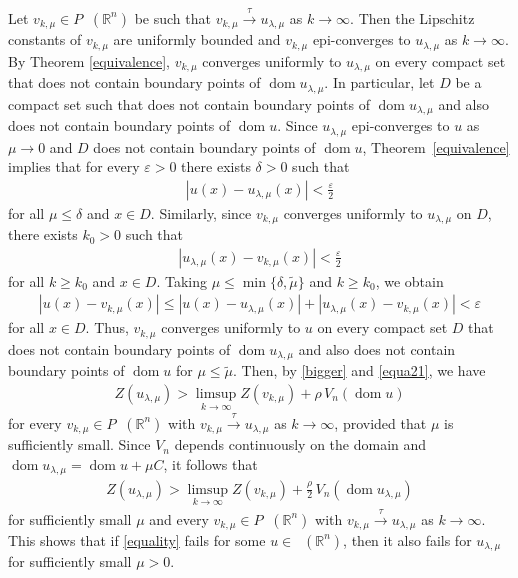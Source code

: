 \documentclass[11pt]{article}
\theoremstyle{definition} %
\newcommand{\RR}{(\mathbb{R}^n)}
\DeclareMathOperator{\LQ}{_{l.q}}
\DeclareMathOperator{\dom}{dom}
\DeclareMathOperator{\LP}{Conv_{lp}}
\newcommand{\seq}{\xrightarrow{\tau}}
\begin{document}
Let $v_{k,\mu}\in P\LQ\RR$ be such that $v_{k,\mu}\seq u_{\lambda,\mu}$ as $k\to \infty$. Then the Lipschitz constants  of $v_{k,\mu}$ are uniformly bounded and  $v_{k,\mu}$ epi-converges to $u_{\lambda,\mu}$ as $k\to \infty$. By Theorem \ref{equivalence}, $v_{k,\mu}$ converges uniformly to $u_{\lambda,\mu}$ on every compact set that does not contain boundary points of $\dom u_{\lambda,\mu}$.  In particular, let $D$ be a compact set  such that does not contain boundary points 
of $\dom u_{\lambda,\mu}$ and also does not contain boundary points of $\dom u$.  Since $u_{\lambda,\mu}$ epi-converges to $u$ as $\mu \to 0$ and $D$ does not 
contain boundary points of $\dom u$, Theorem~\ref{equivalence} implies that 
for every $\varepsilon > 0$ there exists $\delta > 0$ such that
\begin{align*}
    |u(x)-u_{\lambda,\mu}(x)|< \frac{\varepsilon}{2}
\end{align*}
for all $\mu\le \delta$ and $x\in D$. Similarly, since $v_{k,\mu}$ converges uniformly to $u_{\lambda,\mu}$ on $D$,  there exists $k_0 > 0$ such that
\begin{align*}
    |u_{\lambda,\mu}(x)- v_{k,\mu}(x)|< \frac{\varepsilon}{2}
\end{align*}
for all $k\geq k_0$ and $x\in D$. Taking $\mu \le \min\{\delta,\tilde{\mu}\}$ and $k\geq k_0$, we obtain 
\begin{align*}
    |u(x)-v_{k,\mu}(x)|\leq |u(x)-u_{\lambda,\mu}(x)|+ |u_{\lambda,\mu}(x)- v_{k,\mu}(x)|< \varepsilon
\end{align*}
for all $x\in D$. Thus, $v_{k,\mu }$ converges uniformly to $u$ on every compact set  $D$ that does not contain boundary points of $\dom u_{\lambda,\mu} $ and also does not contain boundary points of $\dom u$ for $\mu\leq \tilde{\mu}$. Then, by  \eqref{bigger} and  \eqref{equa21}, we have 
\begin{align*}
 Z\left(u_{\lambda,\mu}\right)>  \limsup_{k\rightarrow \infty} Z(v_{k,\mu})+\rho \, V_n(\dom u)   
\end{align*}
for every $v_{k,\mu}\in P\LQ\RR$ with $v_{k,\mu}\seq u_{\lambda,\mu}$ as $k\to \infty$, provided that $\mu$ is sufficiently small.   Since $V_n$ depends continuously on the domain and $\dom u_{\lambda,\mu}= \dom u +\mu C$, it follows that
\begin{align*}
Z\left(u_{\lambda,\mu}\right)>  \limsup_{k\rightarrow \infty} Z(v_{k,\mu})+\frac{\rho}{2}\, V_n(\dom u_{\lambda,\mu})    
\end{align*}
for  sufficiently small $\mu$ and every $v_{k,\mu}\in P\LQ\RR$ with   $v_{k,\mu}\seq u_{\lambda,\mu}$ as $k\to \infty$. This shows that if \eqref{equality} fails for some $u\in \LP\RR$, then it  also fails for  $u_{\lambda,\mu}$ for sufficiently small $\mu>0$.
  
\end{document}

